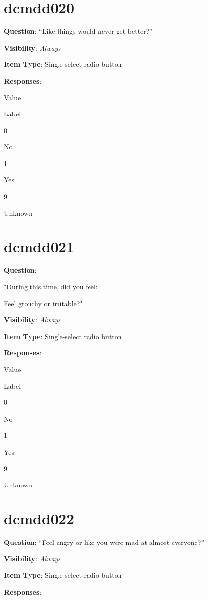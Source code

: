 \documentclass[]{book}
\begin{document}
\hypertarget{dcmdd020}{%
\section{dcmdd020}\label{dcmdd020}}

\textbf{Question}: ``Like things would never get better?''

\textbf{Visibility}: \emph{Always}

\textbf{Item Type}: Single-select radio button

\textbf{Responses}:

Value

Label

0

No

1

Yes

9

Unknown

\hypertarget{dcmdd021}{%
\section{dcmdd021}\label{dcmdd021}}

\textbf{Question}:

"During this time, did you feel:

Feel grouchy or irritable?"

\textbf{Visibility}: \emph{Always}

\textbf{Item Type}: Single-select radio button

\textbf{Responses}:

Value

Label

0

No

1

Yes

9

Unknown

\hypertarget{dcmdd022}{%
\section{dcmdd022}\label{dcmdd022}}

\textbf{Question}: ``Feel angry or like you were mad at almost everyone?''

\textbf{Visibility}: \emph{Always}

\textbf{Item Type}: Single-select radio button

\textbf{Responses}:
\end{document}

